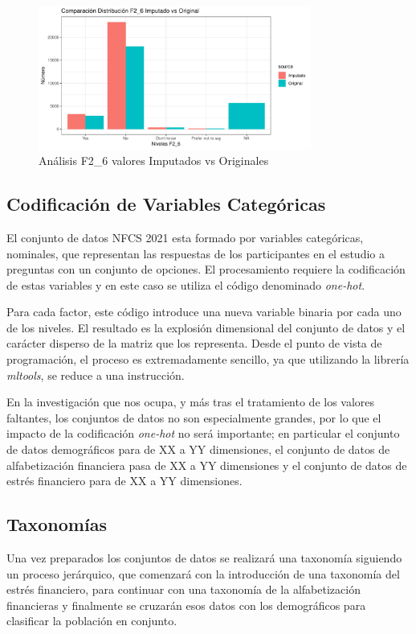 \documentclass[a4paper, 11pt]{article}
\begin{document}
\begin{figure}[ht]
    \centering
    \includegraphics[width=0.8\textwidth]{images/Analysis_MV_F2_6.pdf} 
    \caption{Análisis F2\_6 valores Imputados vs Originales}
    \label{fig:Analysis_MV_F2_6}
\end{figure}

\subsection{Codificación de Variables Categóricas}
El conjunto de datos NFCS 2021 esta formado por variables categóricas, nominales, que
representan las respuestas de los participantes en el estudio a preguntas con un
conjunto de opciones. El procesamiento requiere la codificación de estas variables
y en este caso se utiliza el código denominado \textit{one-hot}. 

Para cada factor, este código introduce una nueva variable binaria por cada uno de los
niveles. El resultado es la explosión dimensional del conjunto de datos y el carácter
disperso de la matriz que los representa. Desde el punto de vista de programación, 
el proceso es extremadamente sencillo, ya que utilizando la librería \textit{mltools}, se
reduce a una instrucción.

En la investigación que nos ocupa, y más tras el tratamiento de los valores faltantes, los
conjuntos de datos no son especialmente grandes, por lo que el impacto de la codificación
\textit{one-hot} no será importante; en particular el conjunto de datos demográficos  para
de XX a YY dimensiones, el conjunto de datos de alfabetización financiera pasa de XX a YY
dimensiones y el conjunto de datos de estrés financiero para de XX a YY dimensiones.

\subsection{Taxonomías}
\label{sec:sub:clustering}
Una vez preparados los conjuntos de datos se realizará una taxonomía siguiendo un proceso
jerárquico, que comenzará con la introducción de una taxonomía del estrés financiero, para
continuar con una taxonomía de la alfabetización financieras y finalmente
se cruzarán esos datos con los demográficos para clasificar la población en conjunto.
\end{document}

